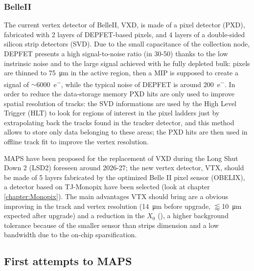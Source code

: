     \subsubsection{BelleII}
        The current vertex detector of BelleII, VXD, is made of a pixel detector (PXD), fabricated with 2 layers of DEPFET-based pixels, and 4 layers of a double-sided silicon strip detectors (SVD)\cite{BelleII-DEPFET}.
        Due to the small capacitance of the collection node, DEPFET presents a high signal-to-noise ratio (in 30-50) thanks to the low instrinsic noise and to the large signal achieved with he fully depleted bulk: pixels are thinned to \SI{75}{\um} in the active region, then a MIP is supposed to create a signal of $\sim$\SI{6000}{e^-}, while the typical noise of DEPFET is around \SI{200}{e^-}.
        In order to reduce the data-storage memory PXD hits are only used to improve spatial resolution of tracks: the SVD informations are used by the High Level Trigger (HLT) to look for regions of interest in the pixel ladders just by extrapolating back the tracks found in the tracker detector, and this method allows to store only data belonging to these areas; the PXD hits are then used in offline track fit to improve the vertex resolution.
        
        MAPS have been proposed for the replacement of VXD during the  Long Shut Down 2 (LSD2) foreseen around 2026-27; the new vertex detector, VTX, should be made of 5 layers fabricated by the optimized Belle II pixel sensor (OBELIX), a detector based on TJ-Monopix have been selected (look at chapter \ref{chapter:Monopix}).    
        The main advantages VTX should bring are a obvious improving in the track and vertex resolution (\SI{14}{\um} before upgrade, $\lessapprox$\SI{10}{\um} expected after upgrade) and a reduction in the $X_0$ (), a higher background tolerance because of the smaller sensor than strips dimension and a low bandwidth due to the on-chip sparsification. 

    \subsection{First attempts to MAPS}
